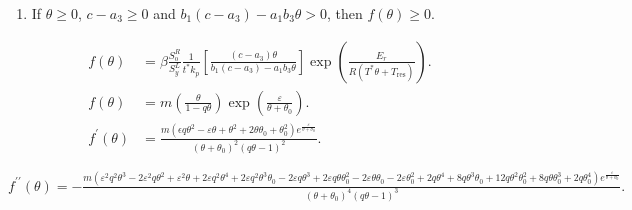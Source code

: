 \documentclass[
    8pt,
    aspectratio=1610,
    c,
    intlimits,
    leqno,
    professionalfonts,
]{beamer}
\begin{document}
\begin{frame}
\begin{enumerate}
		      \

		\item

		      If $\theta\geq 0$, $c-a_{3}\geq 0$ and
		      $b_{1}\left(c-a_{3}\right)-a_{1}b_{3}\theta>0$,
		      then $f\left(\theta\right)\geq 0$.
	\end{enumerate}
\end{frame}

\begin{frame}
	\begin{align*}
		f\left(\theta\right)                      & =
		\beta
		\frac{S^{R}_{\text{o}}}{S^{L}_{y}}
		\frac{1}{t^{\ast}k_{p}}
		\left[
			\frac{
				\left(c-a_{3}\right)\theta}{
				b_{1}
				\left(c-a_{3}\right)-
				a_{1}
				b_{3}
				\theta
			}
			\right]
		\exp
		\left(
		\frac{E_{r}}{
			R\left(T^{\ast}\theta+T_{\text{res}}\right)
		}
		\right).                                                                                                                                                                                                            \\
		f\left(\theta\right)                      & =
		m\left(\frac{\theta}{1-q\theta}\right)
		\exp\left(\frac{\varepsilon}{\theta+\theta_{0}}\right).                                                                                                                                                             \\
		f^{\prime}\left(\theta\right)             & =
		\frac{m\left(\epsilon q\theta^{2}-\varepsilon\theta+\theta^{2}+2\theta\theta_{0}+\theta_{0}^{2}\right)e^{\frac{\varepsilon}{\theta+\theta_{0}}}}{{\left(\theta+\theta_{0}\right)}^{2}{\left(q\theta-1\right)}^{2}}.
	\end{align*}

	{\tiny
		$f^{\prime\prime}\left(\theta\right)=
		-\frac{m\left(\varepsilon^{2}q^{2}\theta^{3}-2\varepsilon^{2}q\theta^{2}+\varepsilon^{2}\theta+2\varepsilon q^{2}\theta^{4}+2\varepsilon q^{2}\theta^{3}\theta_{0}-2\varepsilon q\theta^{3}+2\varepsilon q\theta\theta_{0}^{2}-2\varepsilon\theta\theta_{0}-2\varepsilon\theta_{0}^{2}+2q\theta^{4}+8q\theta^{3}\theta_{0}+12q\theta^{2}\theta_{0}^{2}+8q\theta\theta_{0}^{3}+2q\theta_{0}^{4}\right)e^{\frac{\varepsilon}{\theta+\theta_{0}}}}{\left(\theta+\theta_{0}\right)^{4}\left(q\theta-1\right)^{3}}.$}



\end{frame}
\end{document}
